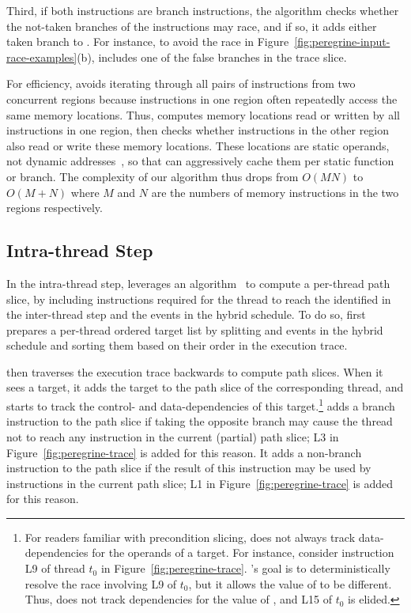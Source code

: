 Third, if both instructions are branch instructions, the algorithm checks
whether the not-taken branches of the instructions may race, and if so, it
adds either taken branch to .
For instance, to avoid the race in Figure~\ref{fig:peregrine-input-race-examples}(b),
\peregrine includes one of the false branches in the trace slice.

For efficiency, \peregrine avoids iterating through all pairs of instructions
from two concurrent regions because instructions in one region often
repeatedly access the same memory locations.  Thus, \peregrine computes memory
locations read or written by all instructions in one region, then checks
whether instructions in the other region also read or write these memory
locations.  These locations are static operands, not dynamic
addresses~\cite{rwset:tacas08}, so that \peregrine can aggressively cache them
per static function or branch.  The complexity of our algorithm thus drops from
$O(MN)$ to $O(M+N)$ where $M$ and $N$ are the numbers of memory
instructions in the two regions respectively.


\subsection{Intra-thread Step} \label{sec:peregrine-intrathread-slice}

In the intra-thread step, \peregrine leverages an
algorithm~\cite{castro:bouncer} to compute a per-thread path slice,
by including instructions required for the thread to reach the
 identified in the inter-thread step and the events in
the hybrid schedule.  To do so, \peregrine first prepares a per-thread ordered
target list by splitting  and events in the hybrid
schedule and sorting them based on their order in the execution trace.

\peregrine then traverses the execution trace backwards to compute path slices.
When it sees a target, it adds the target to the path slice of the
corresponding thread, and starts to track the control- and
data-dependencies of this target.\footnote{For readers familiar with
  precondition slicing, \peregrine does not always track data-dependencies for
  the operands of a target.  For instance, consider instruction
  L9 of thread $t_0$ in Figure~\ref{fig:peregrine-trace}.  \peregrine's goal is
  to deterministically resolve the race involving L9 of $t_0$, but it
  allows the value of  to be different.  Thus, \peregrine does not
  track dependencies for the value of , and L15 of $t_0$ is elided.}
  \peregrine adds a branch
instruction to the path slice if taking the opposite branch may cause the
thread not to reach any instruction in the current (partial) path slice;
L3 in Figure~\ref{fig:peregrine-trace} is added for this reason.
It adds a non-branch instruction to the path slice if the result of this
instruction may be used by instructions in the current path slice;
L1 in Figure~\ref{fig:peregrine-trace} is added for this reason.


